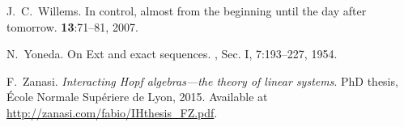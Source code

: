 \begin{thebibliography}{RSW00}
    J.\ C.\ Willems.
    \newblock In control, almost from the beginning until the day
    after tomorrow.
     {\bf 13}:71--81, 2007. 

    N.\ Yoneda. 
    \newblock On Ext and exact sequences.
    , Sec. I, 7:193--227, 1954.

     F.\ Zanasi. 
    \newblock \emph{Interacting Hopf algebras---the theory of linear
    systems}. 
    \newblock PhD thesis, \'Ecole Normale Sup\'eriere de Lyon, 2015. 
    \newblock Available
    at \href{http://zanasi.com/fabio/IHthesis_FZ.pdf}
    {http://zanasi.com/fabio/IHthesis\_FZ.pdf}.

\end{thebibliography}


